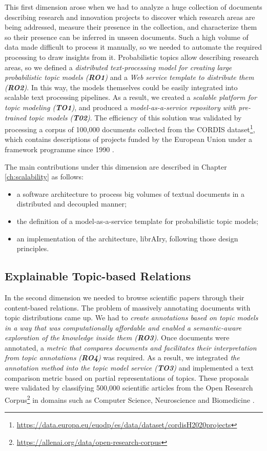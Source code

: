 This first dimension arose when we had to analyze a huge collection of documents describing research and innovation projects to discover which research areas are being addressed, measure their presence in the collection, and characterize them so their presence can be inferred in unseen documents. Such a high volume of data made difficult to process it manually, so we needed to automate the required processing to draw insights from it. Probabilistic topics allow describing research areas, so we defined a \textit{distributed text-processing model for creating large probabilistic topic models (\textbf{RO1})} and a \textit{Web service template to distribute them (\textbf{RO2})}. In this way, the models themselves could be easily integrated into scalable text processing pipelines. As a result, we created a \textit{scalable platform for topic modeling (\textbf{TO1})}, and produced a \textit{model-as-a-service repository with pre-trained topic models (\textbf{T02})}. The efficiency of this solution was validated by processing a corpus of 100,000 documents collected from the CORDIS dataset\footnote{\url{https://data.europa.eu/euodp/es/data/dataset/cordisH2020projects}}, which contains descriptions of projects funded by the European Union under a framework programme since 1990 \citep{Badenes-Olmedo2017}. 

The main contributions under this dimension are described in Chapter \ref{ch:scalability} as follows:
\begin{itemize}
\item a software architecture to process big volumes of textual documents in a distributed and decoupled manner;
\item the definition of a model-as-a-service template for probabilistic topic models;
\item an implementation of the architecture, librAIry, following those design principles.
\end{itemize} 


\subsection{Explainable Topic-based Relations}

In the second dimension we needed to browse scientific papers through their content-based relations. The problem of massively annotating documents with topic distributions came up. We had to \textit{create annotations based on topic models in a way that was computationally affordable and enabled a semantic-aware exploration of the knowledge inside them (\textbf{RO3})}. Once documents were annotated, a \textit{metric that compares documents and facilitates their interpretation from topic annotations (\textbf{RO4})} was required. As a result, we integrated \textit{the annotation method into the topic model service (\textbf{TO3})} and implemented a text comparison metric based on partial representations of topics. These proposals were validated by classifying 500,000 scientific articles from the Open Research Corpus\footnote{\url{https://allenai.org/data/open-research-corpus}} in domains such as Computer Science, Neuroscience and Biomedicine \citep{Badenes-Olmedo2017b, Badenes-Olmedo2017c, Badenes-Olmedo2019b}. 

